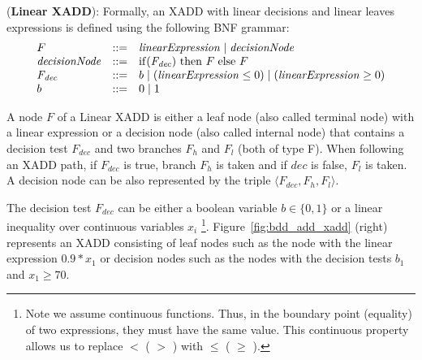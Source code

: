\documentclass[twoside,11pt]{article}
\newenvironment{mydef}[1][Definition]{\begin{trivlist}
\item[\hskip \labelsep {\bfseries #1}]}{\end{trivlist}}
\begin{document}
\begin{mydef}(\textbf{Linear XADD}):
Formally, an XADD with linear decisions and linear leaves expressions is defined using the following BNF grammar: 
\begin{equation}
\nonumber
\begin{array}{lll}
F&::=&  \mathit{linearExpression}  \hspace{1mm} \vert \hspace{1mm}   \mathit{decisionNode}\\
\mathit{decisionNode} &::=& \mathrm{if} (\mathit{F_{dec}})\ \mathrm{then}\ F \hspace{1mm} \mathrm{else}\ F \\ 
\mathit{F_{dec}} &::=& b \hspace{1mm}  \vert \hspace{1mm}  ( \mathit{linearExpression} \leq 0)  \hspace{1mm}\vert \hspace{1mm}
 ( \mathit{linearExpression} \geq 0)   
\\
b&::=& 0\hspace{1mm} |\hspace{1mm} 1
\end{array}
\end{equation}
\end{mydef}

A node $F$ of a Linear XADD is either a leaf node (also called terminal node) with a linear expression or a decision node (also called internal node) that contains a decision test $\mathit{F_{dec}}$ and two branches $F_h$ and $F_l$ (both of type F). When following an XADD path, if  $\mathit{F_{dec}}$ is true, branch $F_h$ is taken and if $\mathit{dec}$ is false, $F_l$ is taken. A decision node can be also represented by the triple $\langle F_{\mathit{dec}}, F_h, F_l \rangle$.

The decision test $\mathit{F_{dec}}$ can be either a boolean variable $b\in \lbrace 0,1 \rbrace$ or a linear inequality over continuous variables $x_i$ \footnote {Note we assume continuous functions. Thus, in the boundary point (equality) of two expressions, they must have the same value. This continuous property allows us to replace $<$ ( $>$ ) with $\leq$ ( $\geq$ ).}. Figure~\ref{fig:bdd_add_xadd} (right) represents an XADD consisting of leaf nodes such as the node with the linear expression $0.9*x_1$ or decision nodes such as the nodes with the decision tests $b_1$ and $x_1 \geq 70$. 
\end{document}
